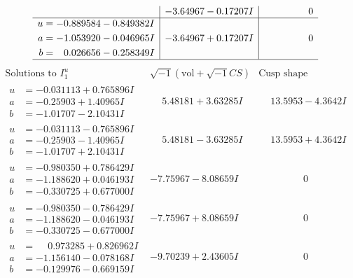 \documentclass[1p]{elsarticle_modified}
\theoremstyle{definition}
\newcommand{\I}{\sqrt{-1}}
\begin{document}
$$\begin{array}{c|c|c}
 & -3.64967 - 0.17207 I & \phantom{-0.000000 } 0 \\ \hline\begin{aligned}
u &= -0.889584 - 0.849382 I \\
a &= -1.053920 - 0.046965 I \\
b &= \phantom{-}0.026656 - 0.258349 I\end{aligned}
 & -3.64967 + 0.17207 I & \phantom{-0.000000 } 0\\
 \hline 
 \end{array}$$\newpage$$\begin{array}{c|c|c}  
\text{Solutions to }I^u_{1}& \I (\text{vol} + \sqrt{-1}CS) & \text{Cusp shape}\\
 \hline 
\begin{aligned}
u &= -0.031113 + 0.765896 I \\
a &= -0.25903 + 1.40965 I \\
b &= -1.01707 - 2.10431 I\end{aligned}
 & \phantom{-}5.48181 + 3.63285 I & \phantom{-}13.5953 - 4.3642 I \\ \hline\begin{aligned}
u &= -0.031113 - 0.765896 I \\
a &= -0.25903 - 1.40965 I \\
b &= -1.01707 + 2.10431 I\end{aligned}
 & \phantom{-}5.48181 - 3.63285 I & \phantom{-}13.5953 + 4.3642 I \\ \hline\begin{aligned}
u &= -0.980350 + 0.786429 I \\
a &= -1.188620 + 0.046193 I \\
b &= -0.330725 + 0.677000 I\end{aligned}
 & -7.75967 - 8.08659 I & \phantom{-0.000000 } 0 \\ \hline\begin{aligned}
u &= -0.980350 - 0.786429 I \\
a &= -1.188620 - 0.046193 I \\
b &= -0.330725 - 0.677000 I\end{aligned}
 & -7.75967 + 8.08659 I & \phantom{-0.000000 } 0 \\ \hline\begin{aligned}
u &= \phantom{-}0.973285 + 0.826962 I \\
a &= -1.156140 - 0.078168 I \\
b &= -0.129976 - 0.669159 I\end{aligned}
 & -9.70239 + 2.43605 I & \phantom{-0.000000 } 0 \\ \hline\begin{aligned}

\end{aligned}
\end{array}$$
\end{document}
